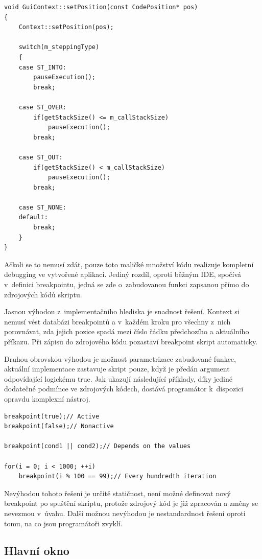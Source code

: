 \documentclass[11pt,twoside,a4paper]{book}
\begin{document}
\begin{verbatim}
void GuiContext::setPosition(const CodePosition* pos)
{
    Context::setPosition(pos);

    switch(m_steppingType)
    {
    case ST_INTO:
        pauseExecution();
        break;

    case ST_OVER:
        if(getStackSize() <= m_callStackSize)
            pauseExecution();
        break;

    case ST_OUT:
        if(getStackSize() < m_callStackSize)
            pauseExecution();
        break;

    case ST_NONE:
    default:
        break;
    }
}
\end{verbatim}

Ačkoli se to nemusí zdát, pouze toto maličké množství kódu realizuje kompletní debugging ve vytvořené aplikaci. Jediný rozdíl, oproti běžným IDE, spočívá v~definici breakpointu, jedná se zde o~zabudovanou funkci zapsanou přímo do zdrojových kódů skriptu.

Jasnou výhodou z~implementačního hlediska je snadnost řešení. Kontext si nemusí vést databázi breakpointů a v~každém kroku pro všechny z~nich porovnávat, zda jejich pozice spadá mezi číslo řádku předchozího a aktuálního příkazu. Při zápisu do zdrojového kódu pozastaví breakpoint skript automaticky.

Druhou obrovskou výhodou je možnost parametrizace zabudované funkce, aktuální implementace zastavuje skript pouze, když je předán argument odpovídající logickému true. Jak ukazují následující příklady, díky jediné dodatečné podmínce ve zdrojových kódech, dostává programátor k~dispozici opravdu komplexní nástroj.

\begin{verbatim}
breakpoint(true);// Active
breakpoint(false);// Nonactive

breakpoint(cond1 || cond2);// Depends on the values

for(i = 0; i < 1000; ++i)
    breakpoint(i % 100 == 99);// Every hundredth iteration
\end{verbatim}

Nevýhodou tohoto řešení je určitě statičnost, není možné definovat nový breakpoint po spuštění skriptu, protože zdrojový kód je již zpracován a změny se nevezmou v~úvahu. Další možnou ne\-vý\-ho\-dou je nestandardnost řešení oproti tomu, na co jsou programátoři zvyklí.


\subsection{Hlavní okno}
\end{document}
